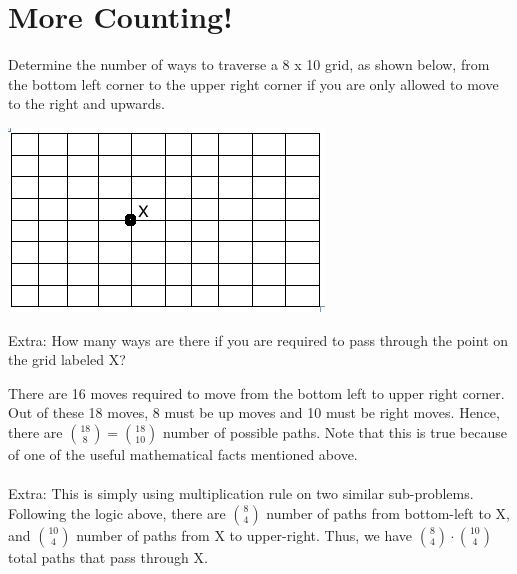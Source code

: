 \documentclass[11pt]{article}
\begin{document}
\section*{More Counting!}
\begin{exercise}
Determine the number of ways to traverse a 8 x 10 grid, as shown below, from the bottom left corner to the upper right corner if you are only allowed to move to the right and upwards.

\begin{center}
\includegraphics[scale=0.6]{chessboard}
\end{center}

\noindent Extra: How many ways are there if you are required to pass through the point on the grid labeled X?
\end{exercise}
\begin{solution}
There are 16 moves required to move from the bottom left to upper right corner. Out of these 18 moves, 8 must be up moves and 10 must be right moves. Hence, there are $\binom{18}{8} = \binom{18}{10}$ number of possible paths. Note that this is true because of one of the useful mathematical facts mentioned above.\\
\\
Extra: This is simply using multiplication rule on two similar sub-problems. Following the logic above, there are $\binom{8}{4}$ number of paths from bottom-left to X, and $\binom{10}{4}$ number of paths from X to upper-right. Thus, we have $\binom{8}{4} \cdot \binom{10}{4}$ total paths that pass through X.
\end{solution}
\end{document}
